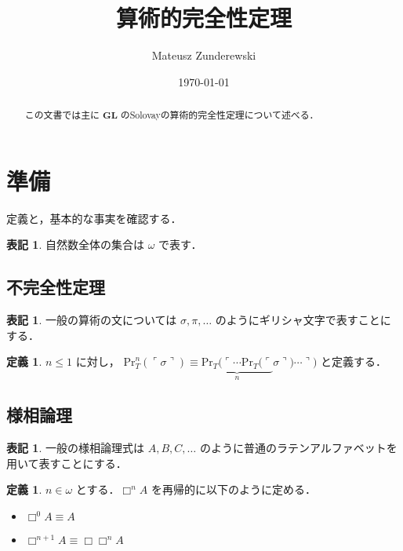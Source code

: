 \documentclass{jsarticle}
\title{算術的完全性定理}
\author{Mateusz Zunderewski}
\date{\today}
\newcommand*{\Logic}[1]{\mathbf{#1}}
\newcommand*{\LogicGL}{\Logic{GL}}
\newcommand*{\Provable}{\mathrm{Pr}}
\theoremstyle{definition}
\newtheorem{definition}[theorem]{定義}
\newtheorem{notation}[theorem]{表記}
\begin{document}
\maketitle

\begin{abstract}
	この文書では主に $\LogicGL$ のSolovayの算術的完全性定理について述べる．
\end{abstract}

\section{準備}

定義と，基本的な事実を確認する．

\begin{notation}
	自然数全体の集合は $\omega$ で表す．
\end{notation}

\subsection{不完全性定理}

\begin{notation}
	一般の算術の文については $\sigma, \pi, \dots$ のようにギリシャ文字で表すことにする．
\end{notation}

\begin{definition}
	$n \leq 1$ に対し，
	$\Provable_T^n(\ulcorner \sigma \urcorner) \equiv \underbrace{\Provable_T(\ulcorner \cdots \Provable_T(\ulcorner}_{n} \sigma \urcorner) \cdots \urcorner)$ と定義する．
\end{definition}


\subsection{様相論理}

\begin{notation}
	一般の様相論理式は $A,B,C,\dots$ のように普通のラテンアルファベットを用いて表すことにする．
\end{notation}

\begin{definition}
	$n \in \omega$ とする．$\Box^n A$ を再帰的に以下のように定める．
	\begin{itemize}
		\item $\Box^0 A \equiv A$
		\item $\Box^{n+1} A \equiv \Box \Box^n A$
	\end{itemize}
\end{definition}
\end{document}
